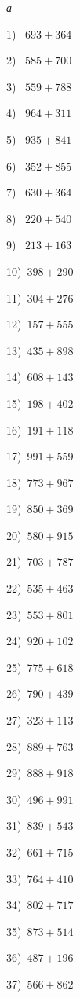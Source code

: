 \documentclass{article}
\begin{document}
 
\begin{center} 
   \large{\textit{а}} 
\end{center}\begin{multicols}{2}
1)$\,\,\,\,\,693+364$ \par 
2)$\,\,\,\,\,585+700$ \par 
3)$\,\,\,\,\,559+788$ \par 
4)$\,\,\,\,\,964+311$ \par 
5)$\,\,\,\,\,935+841$ \par 
6)$\,\,\,\,\,352+855$ \par 
7)$\,\,\,\,\,630+364$ \par 
8)$\,\,\,\,\,220+540$ \par 
9)$\,\,\,\,\,213+163$ \par 
10)$\,\,\,398+290$ \par 
11)$\,\,\,304+276$ \par 
12)$\,\,\,157+555$ \par 
13)$\,\,\,435+898$ \par 
14)$\,\,\,608+143$ \par 
15)$\,\,\,198+402$ \par 
16)$\,\,\,191+118$ \par 
17)$\,\,\,991+559$ \par 
18)$\,\,\,773+967$ \par 
19)$\,\,\,850+369$ \par 
20)$\,\,\,580+915$ \par 
21)$\,\,\,703+787$ \par 
22)$\,\,\,535+463$ \par 
23)$\,\,\,553+801$ \par 
24)$\,\,\,920+102$ \par 
25)$\,\,\,775+618$ \par 
26)$\,\,\,790+439$ \par 
27)$\,\,\,323+113$ \par 
28)$\,\,\,889+763$ \par 
29)$\,\,\,888+918$ \par 
30)$\,\,\,496+991$ \par 
31)$\,\,\,839+543$ \par 
32)$\,\,\,661+715$ \par 
33)$\,\,\,764+410$ \par 
34)$\,\,\,802+717$ \par 
35)$\,\,\,873+514$ \par 
36)$\,\,\,487+196$ \par 
37)$\,\,\,566+862$ \par 

\end{multicols}
\end{document}
